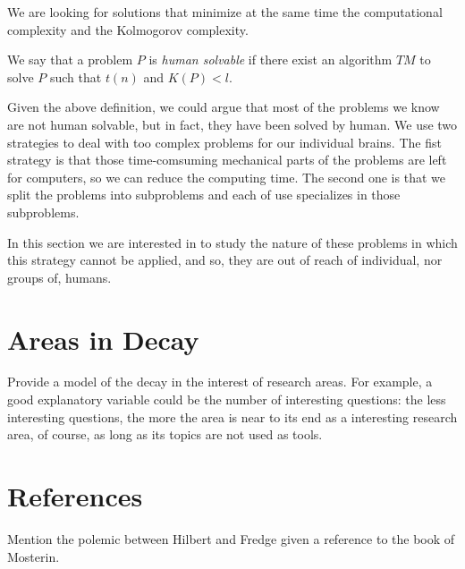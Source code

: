 We are looking for solutions that minimize at the same time the computational complexity and the Kolmogorov complexity.

\begin{definition}
We say that a problem $P$ is \emph{human solvable} if there exist an algorithm $TM$ to solve $P$ such that $t(n)$ and $K(P) < l$.
\end{definition}

Given the above definition, we could argue that most of the problems we know are not human solvable, but in fact, they have been solved by human. We use two strategies to deal with too complex problems for our individual brains. The fist strategy is that those time-comsuming mechanical parts of the problems are left for computers, so we can reduce the computing time. The second one is that we split the problems into subproblems and each of use specializes in those subproblems.

In this section we are interested in to study the nature of these problems in which this strategy cannot be applied, and so, they are out of reach of individual, nor groups of, humans.

%
%

\section{Areas in Decay}

{\color{red} Provide a model of the decay in the interest of research areas. For example, a good explanatory variable could be the number of interesting questions: the less interesting questions, the more the area is near to its end as a interesting research area, of course, as long as its topics are not used as tools.}

%
%

\section*{References}

{\color{red} Mention the polemic between Hilbert and Fredge given a reference to the book of Mosterin.}


